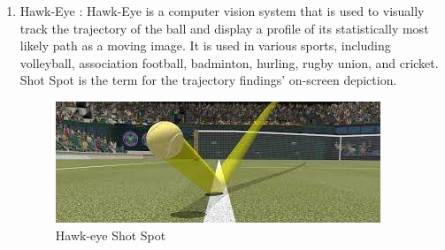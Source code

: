 \documentclass[12pt]{article}
\begin{document}
\begin{enumerate}
    \item Hawk-Eye \cite{Hawk-eye}: Hawk-Eye is a computer vision system that is used to visually track the trajectory of the ball and display a profile of its statistically most likely path as a moving image. It is used in various sports, including volleyball, association football, badminton, hurling, rugby union, and cricket. Shot Spot is the term for the trajectory findings' on-screen depiction.
        \begin{figure}[hbt!]
            \centering
            \includegraphics{figures/hawk-eye decision.jpeg}
            \caption{Hawk-eye Shot Spot}
            \label{fig:hawk-eye}
        \end{figure}
        \newpage


\end{enumerate}
\end{document}
